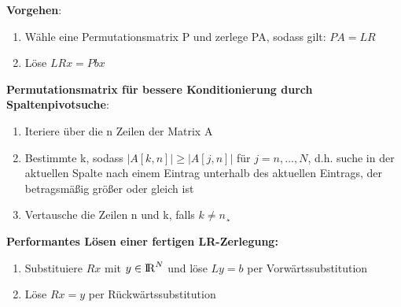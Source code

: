 \documentclass[10pt,a4paper]{article}
\def\realnumbers{{\rm I\!R}}
\begin{document}
	\textbf{Vorgehen}:
	\begin{enumerate}
		\item Wähle eine Permutationsmatrix P und zerlege PA, sodass gilt: $PA = LR$
		\item Löse $LRx = Pbx$
	\end{enumerate}
	\textbf{Permutationsmatrix für bessere Konditionierung durch Spaltenpivotsuche}:
	\begin{enumerate}
		\item Iteriere über die n Zeilen der Matrix A
		\item Bestimmte k, sodass $|A[k, n]| \geq |A[j, n]|$ für $j = n, ..., N$, d.h. suche in der aktuellen Spalte nach einem Eintrag unterhalb des aktuellen Eintrags, der betragsmäßig größer oder gleich ist
		\item Vertausche die Zeilen n und k, falls $k \neq n¸$
	\end{enumerate}
	\textbf{Performantes Lösen einer fertigen LR-Zerlegung:}
	\begin{enumerate}
		\item Substituiere $Rx$ mit $y\in\realnumbers^N$ und löse $Ly = b$ per Vorwärtssubstitution
		\item Löse $Rx = y$ per Rückwärtssubstitution
	\end{enumerate}
\end{document}
